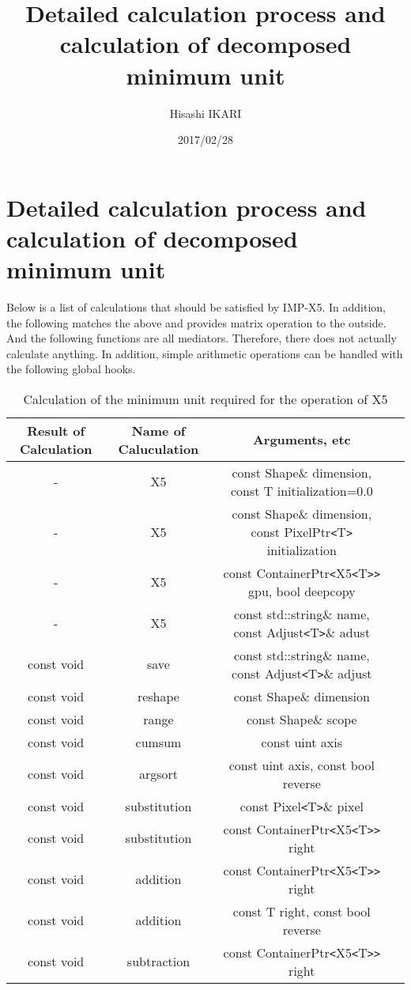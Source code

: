 \documentclass{jsarticle}
\title{Detailed calculation process and calculation of decomposed minimum unit}
\author{Hisashi IKARI}
\date{2017/02/28}
\begin{document}
\part{Detailed calculation process and calculation of decomposed minimum unit}
\label{Detailed calculation process and calculation of decomposed minimum unit}

Below is a list of calculations that should be satisfied by IMP-X5.
In addition, the following matches the above and provides matrix operation to the outside.
And the following functions are all mediators. Therefore, there does not actually calculate anything.
In addition, simple arithmetic operations can be handled with the following global hooks.

\begin{table}[htb]
  \caption{Calculation of the minimum unit required for the operation of X5}
  \begin{tabular} {|c|c|c|c|} \hline
	Result of Calculation & Name of Caluculation & Arguments, etc \\ \hline
	- & X5 & const Shape\& dimension, const T initialization=0.0 \\
	- & X5 & const Shape\& dimension, const PixelPtr\verb*|<|T\verb*|>| initialization \\
	- & X5 & const ContainerPtr\verb*|<|X5\verb*|<|T\verb*|>|\verb*|>| gpu, bool deepcopy \\
	- & X5 & const std::string\& name, const Adjust\verb*|<|T\verb*|>|\& adust \\
	const void & save & const std::string\& name, const Adjust\verb*|<|T\verb*|>|\& adjust \\
	const void & reshape & const Shape\& dimension \\
	const void & range & const Shape\& scope \\
	const void & cumsum & const uint axis \\
	const void & argsort & const uint axis, const bool reverse \\
	const void & substitution & const Pixel\verb*|<|T\verb*|>|\& pixel \\
	const void & substitution & const ContainerPtr\verb*|<|X5\verb*|<|T\verb*|>|\verb*|>| right \\
	const void & addition & const ContainerPtr\verb*|<|X5\verb*|<|T\verb*|>|\verb*|>| right \\
	const void & addition & const T right, const bool reverse \\
	const void & subtraction & const ContainerPtr\verb*|<|X5\verb*|<|T\verb*|>|\verb*|>| right \\

\end{tabular}
\end{table}
\end{document}
